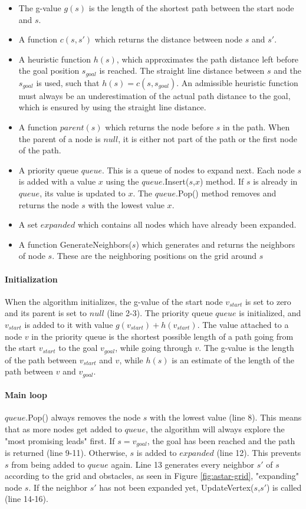 \begin{itemize}
\item The g-value $g(s)$ is the length of the shortest path between the start node and $s$.
\item A function $c(s,s')$ which returns the distance between node $s$ and $s'$.
\item A heuristic function $h(s)$, which approximates the path distance left before the goal position $s_{goal}$ is reached. The straight line distance between $s$ and the $s_{goal}$ is used, such that $h(s) = c(s,s_{goal})$. An admissible heuristic function must always be an underestimation of the actual path distance to the goal, which is ensured by using the straight line distance. 
\item A function $parent(s)$ which returns the node before $s$ in the path. When the parent of a node is $null$, it is either not part of the path or the first node of the path.
\item A priority queue $queue$. This is a queue of nodes to expand next. Each node $s$ is added with a value $x$ using the $queue.$Insert($s$,$x$) method. If $s$ is already in $queue$, its value is updated to $x$. The $queue$.Pop() method removes and returns the node $s$ with the lowest value $x$.
\item A set $expanded$ which contains all nodes which have already been expanded.
\item A function GenerateNeighbors($s$) which generates and returns the neighbors of node $s$. These are the neighboring positions on the grid around $s$
\end{itemize}
\paragraph{Initialization}
When the algorithm initializes, the g-value of the start node $v_{start}$ is set to zero and its parent is set to $null$ (line 2-3). The priority queue $queue$ is initialized, and $v_{start}$ is added to it with value $g(v_{start}) + h(v_{start})$. The value attached to a node $v$ in the priority queue is the shortest possible length of a path going from the start $v_{start}$ to the goal $v_{goal}$, while going through $v$. The g-value is the length of the path between $v_{start}$ and $v$, while $h(s)$ is an estimate of the length of the path between $v$ and $v_{goal}$.
\paragraph{Main loop}
$queue$.Pop() always removes the node $s$ with the lowest value (line 8). This means that as more nodes get added to $queue$, the algorithm will always explore the "most promising leads" first. If $s = v_{goal}$, the goal has been reached and the path is returned (line 9-11). Otherwise, $s$ is added to $expanded$ (line 12). This prevents $s$ from being added to $queue$ again. Line 13 generates every neighbor $s'$ of $s$ according to the grid and obstacles, as seen in Figure \ref{fig:astar-grid}, "expanding" node $s$. If the neighbor $s'$ has not been expanded yet, UpdateVertex($s$,$s'$) is called (line 14-16).
